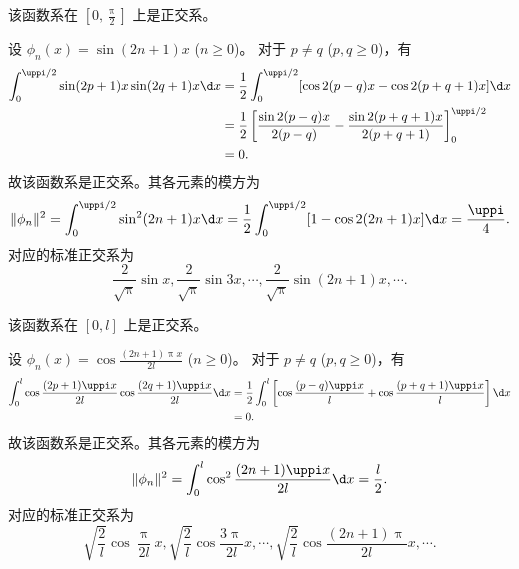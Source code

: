 \begin{myproof}
    该函数系在 $[0, \frac{\uppi}{2}]$ 上是正交系。

    设 $\phi_n(x) = \sin(2n+1)x$ ($n \geqslant 0$)。
    对于 $p \neq q$ ($p, q \geqslant 0$)，有
    \begin{equation}\label{eq:orth-3-1}
        \begin{aligned}
            \int_{0}^{\uppi/2} \sin(2p+1)x \sin(2q+1)x \d x & = \frac{1}{2} \int_{0}^{\uppi/2} [\cos 2(p-q)x - \cos 2(p+q+1)x] \d x                                    \\
                                                            & = \frac{1}{2} \left[ \frac{\sin 2(p-q)x}{2(p-q)} - \frac{\sin 2(p+q+1)x}{2(p+q+1)} \right]_{0}^{\uppi/2} \\
                                                            & = 0.
        \end{aligned}
    \end{equation}
    故该函数系是正交系。其各元素的模方为
    \begin{equation}\label{eq:norm-3}
        \|\phi_n\|^2 = \int_{0}^{\uppi/2} \sin^2(2n+1)x \d x = \frac{1}{2} \int_{0}^{\uppi/2} [1 - \cos 2(2n+1)x] \d x = \frac{\uppi}{4}.
    \end{equation}
    对应的标准正交系为
    \begin{equation}
        \boxed{\frac{2}{\sqrt{\uppi}}\sin x, \frac{2}{\sqrt{\uppi}}\sin 3x, \cdots, \frac{2}{\sqrt{\uppi}}\sin(2n+1)x, \cdots}.
    \end{equation}

    该函数系在 $[0, l]$ 上是正交系。

    设 $\phi_n(x) = \cos \frac{(2n+1)\uppi x}{2l}$ ($n \geqslant 0$)。
    对于 $p \neq q$ ($p, q \geqslant 0$)，有
    \begin{equation}\label{eq:orth-4-1}
        \begin{aligned}
            \int_{0}^{l} \cos \frac{(2p+1)\uppi x}{2l} \cos \frac{(2q+1)\uppi x}{2l} \d x & = \frac{1}{2} \int_{0}^{l} \left[ \cos \frac{(p-q)\uppi x}{l} + \cos \frac{(p+q+1)\uppi x}{l} \right] \d x \\
                                                                                          & = 0.
        \end{aligned}
    \end{equation}
    故该函数系是正交系。其各元素的模方为
    \begin{equation}\label{eq:norm-4}
        \|\phi_n\|^2 = \int_{0}^{l} \cos^2 \frac{(2n+1)\uppi x}{2l} \d x = \frac{l}{2}.
    \end{equation}
    对应的标准正交系为
    \begin{equation}
        \boxed{\sqrt{\frac{2}{l}}\cos \frac{\uppi}{2l}x, \sqrt{\frac{2}{l}}\cos \frac{3\uppi}{2l}x, \cdots, \sqrt{\frac{2}{l}}\cos \frac{(2n+1)\uppi}{2l}x, \cdots}.
    \end{equation}
\end{myproof}

